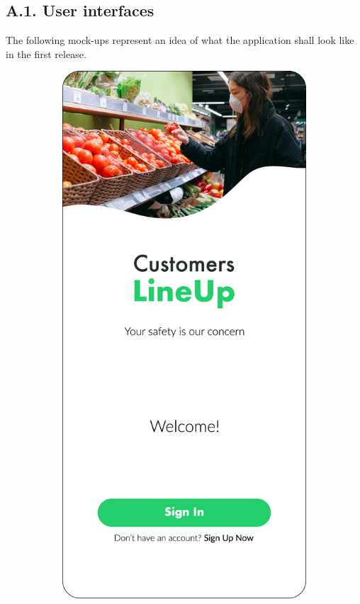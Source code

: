 \subsection{A.1. User interfaces}

The following mock-ups represent an idea of what the application shall look like in the first release.

\begin{figure}[H]
    \centering
    \begin{subfigure}[t]{0.28\textwidth} 
        \includegraphics{../mockups/home}

\end{subfigure}
\end{figure}
